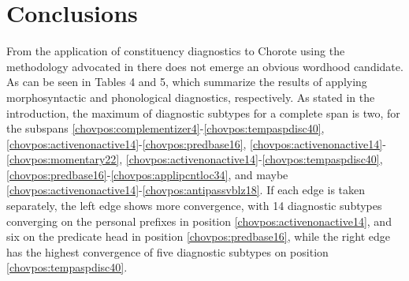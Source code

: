 \documentclass[output=paper]{langscibook}
\begin{document}
\section{Conclusions}\label{bkm:Ref88847346}

From the application of constituency diagnostics to Chorote using the methodology advocated in \citet{Tallman2021} there does not emerge an obvious wordhood candidate. As can be seen in Tables 4 and 5, which summarize the results of applying morphosyntactic and phonological diagnostics, respectively. As stated in the introduction, the maximum of diagnostic subtypes for a complete span is two, for the subspans \ref{chovpos:complementizer4}{}-\ref{chovpos:tempaspdisc40}, \ref{chovpos:activenonactive14}{}-\ref{chovpos:predbase16}, \ref{chovpos:activenonactive14}{}-\ref{chovpos:momentary22}, \ref{chovpos:activenonactive14}{}-\ref{chovpos:tempaspdisc40}, \ref{chovpos:predbase16}{}-\ref{chovpos:applipcntloc34}, and maybe \ref{chovpos:activenonactive14}{}-\ref{chovpos:antipassvblz18}. If each edge is taken separately, the left edge shows more convergence, with 14 diagnostic subtypes converging on the personal prefixes in position \ref{chovpos:activenonactive14}, and six on the predicate head in position \ref{chovpos:predbase16}, while the right edge has the highest convergence of five diagnostic subtypes on position \ref{chovpos:tempaspdisc40}.
\end{document}
